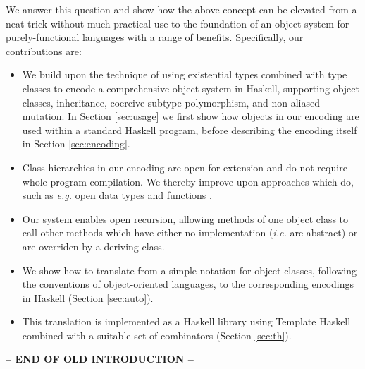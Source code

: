 We answer this question and show how the above concept can be elevated from a neat trick without much practical use to the foundation of an object system for purely-functional languages with a range of benefits. Specifically, our contributions are:
\begin{itemize}
    \item We build upon the technique of using existential types combined with type classes to encode a comprehensive object system in Haskell, supporting object classes, inheritance, coercive subtype polymorphism, and non-aliased mutation. In Section \ref{sec:usage} we first show how objects in our encoding are used within a standard Haskell program, before describing the encoding itself in Section \ref{sec:encoding}.
    \item Class hierarchies in our encoding are open for extension and do not require whole-program compilation. We thereby improve upon approaches which do, such as \emph{e.g.} open data types and functions \cite{loh2006open}.
    \item Our system enables open recursion, allowing methods of one object class to call other methods which have either no implementation (\emph{i.e.} are abstract) or are overriden by a deriving class.
    \item We show how to translate from a simple notation for object classes, following the conventions of object-oriented languages, to the corresponding encodings in Haskell (Section \ref{sec:auto}).
    \item This translation is implemented as a Haskell library using Template Haskell combined with a suitable set of combinators (Section \ref{sec:th}).
\end{itemize}

\textbf{-- END OF OLD INTRODUCTION --}